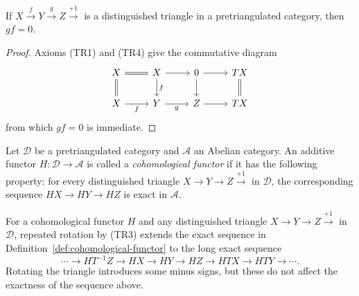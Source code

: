 
\begin{lemma}\label{prop:dt-composite-null}
	If $X \xrightarrow{f} Y \xrightarrow{g} Z \xrightarrow{+1}$ is a
	distinguished triangle in a pretriangulated category, then $gf=0$.
\end{lemma}

\begin{proof}
	Axioms (TR1) and (TR4) give the commutative diagram
	\[\begin{tikzcd}
		X \arrow[equal, d] \arrow[equal, r] & X \arrow[r] \arrow[d, "f"] & 0 \arrow[d] \arrow[r] & TX \arrow[equal, d] \\
		X \arrow[r, "f"'] & Y \arrow[r, "g"'] & Z \arrow[r] & TX
	\end{tikzcd}\]
	from which $gf=0$ is immediate.
\end{proof}

\begin{definition}\label{def:cohomological-functor}
	Let $\mathcal{D}$ be a pretriangulated category and $\mathcal{A}$ an
	Abelian category. An additive functor $H: \mathcal{D} \to \mathcal{A}$
	is called a \emph{cohomological functor} if it has the following
	property: for every distinguished triangle
	$X \to Y \to Z \xrightarrow{+1}$ in $\mathcal{D}$, the corresponding
	sequence $HX \to HY \to HZ$ is exact in $\mathcal{A}$.
\end{definition}

\begin{remark}\label{rem:cohomological-functor-long}
	For a cohomological functor $H$ and any distinguished triangle
	$X \to Y \to Z \xrightarrow{+1}$ in $\mathcal{D}$, repeated rotation by
	(TR3) extends the exact sequence in
	Definition~\ref{def:cohomological-functor} to the long exact sequence
	\[ \cdots \to HT^{-1}Z \to HX \to HY \to HZ \to HTX \to HTY \to \cdots . \]
	Rotating the triangle introduces some minus signs, but these do not affect
	the exactness of the sequence above.
\end{remark}

